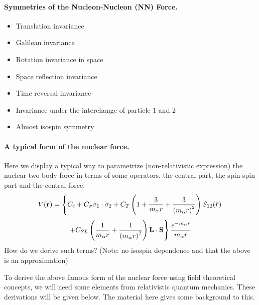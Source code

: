 \documentclass[%
oneside,                 %
final,                   %
10pt]{article}
\begin{document}
\noindent
\paragraph{Symmetries of the Nucleon-Nucleon (NN) Force.}
\begin{itemize}
\item Translation invariance

\item Galilean invariance

\item Rotation invariance in space

\item Space reflection invariance

\item Time reversal invariance

\item Invariance under the interchange of particle $1$ and $2$

\item Almost isospin symmetry
\end{itemize}

\noindent
\paragraph{A typical form of the nuclear force.}
Here we display a typical way to parametrize (non-relativistic expression) the nuclear two-body force
in terms of some operators, the central part, the spin-spin part and the central force.
\[
V(\mathbf{r})= \left\{ C_c + C_\mathbf{\sigma} \mathbf{\sigma}_1\cdot\mathbf{\sigma}_2
 + C_T \left( 1 + {3\over m_\alpha r} + {3\over\left(m_\alpha r\right)^2}\right) S_{12} (\hat r)\right. 
\]
\[
\left. + C_{SL} \left( {1\over m_\alpha r} + {1\over \left( m_\alpha r\right)^2}
\right) \mathbf{L}\cdot \mathbf{S}
\right\} \frac{e^{-m_\alpha r}}{m_\alpha r}
\]
How do we derive such terms?  (Note: no isospin dependence and that the above is an approximation)

To derive the above famous form of the nuclear force using field theoretical concepts, we will need some 
elements from relativistic quantum mechanics. These derivations will be given below. 
The material here gives some background to this.
\end{document}
